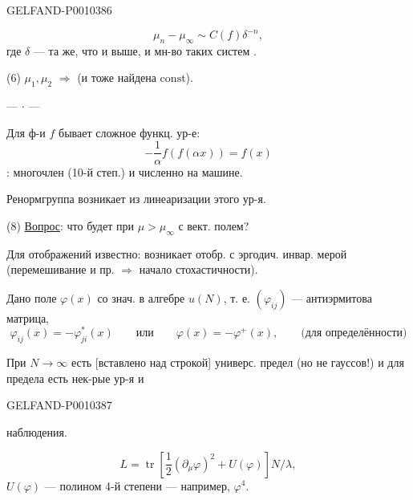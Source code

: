 \begin{GelfandAdjacentEvidence}{GELFAND-P001038}{6}


\begin{equation*}
\mu_n-\mu_\infty\sim C(f)\delta^{-n},
\tag{5}
\end{equation*}
где $\delta$ --- та же, что и выше,
и мн-во таких систем .


(6) $\mu_1,\mu_2$ $\Rightarrow$ 
(и тоже найдена $\mathrm{const}$).

\begin{center}--- $\cdot$ ---\end{center}

Для ф-и $f$ бывает сложное функц. ур-е:
\begin{equation*}
-\frac1\alpha f(f(\alpha x))=f(x)
\tag{7}
\end{equation*}
: многочлен (10-й степ.) и численно на машине.

Ренормгруппа возникает из линеаризации этого ур-я.

(8) \underline{Вопрос}: что будет при $\mu>\mu_\infty$ с вект. полем?

Для отображений известно: возникает отобр. с эргодич. инвар. мерой
(перемешивание и пр. $\Rightarrow$ начало стохастичности).


Дано поле $\varphi(x)$ со знач. в алгебре $u(N)$, т. е. $(\varphi_{ij})$ ---
антиэрмитова матрица,
\begin{equation*}
\varphi_{ij}(x)=-\varphi_{ji}^{*}(x)\qquad\text{или}\qquad
\varphi(x)=-\varphi^{+}(x),\qquad\text{(для определённости)}
\tag{1}
\end{equation*}

При $N\to\infty$ есть [вставлено над строкой] универс. предел
(но не гауссов!) и для предела есть нек-рые ур-я и
\end{GelfandAdjacentEvidence}
\begin{GelfandAdjacentEvidence}{GELFAND-P001038}{7}

наблюдения.
\end{GelfandAdjacentEvidence}


\begin{equation*}
L=\operatorname{tr}\left[\frac12(\partial_\mu\varphi)^2+U(\varphi)\right]N/\lambda,
\tag{2}
\end{equation*}
$U(\varphi)$ --- полином 4-й степени --- например, $\varphi^4$.

